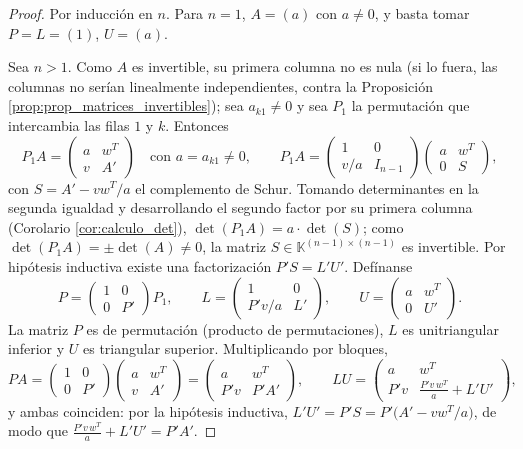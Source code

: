 \documentclass[11pt, a4paper]{article}
\begin{document}
\begin{proof}
Por inducción en $n$. Para $n = 1$, $A = (a)$ con $a \neq 0$, y basta tomar $P = L = (1)$, $U = (a)$.

Sea $n > 1$. Como $A$ es invertible, su primera columna no es nula (si lo fuera, las columnas no serían linealmente independientes, contra la Proposición \ref{prop:prop_matrices_invertibles}); sea $a_{k1} \neq 0$ y sea $P_1$ la permutación que intercambia las filas $1$ y $k$. Entonces
\[
P_1 A = \begin{pmatrix} a & w^T \\ v & A' \end{pmatrix} \quad \text{con } a = a_{k1} \neq 0,
\qquad
P_1 A = \begin{pmatrix} 1 & 0 \\ v/a & I_{n-1} \end{pmatrix} \begin{pmatrix} a & w^T \\ 0 & S \end{pmatrix},
\]
con $S = A' - v w^T / a$ el complemento de Schur. Tomando determinantes en la segunda igualdad y desarrollando el segundo factor por su primera columna (Corolario \ref{cor:calculo_det}), $\det(P_1 A) = a \cdot \det(S)$; como $\det(P_1 A) = \pm \det(A) \neq 0$, la matriz $S \in \mathbb{K}^{(n-1) \times (n-1)}$ es invertible. Por hipótesis inductiva existe una factorización $P' S = L' U'$. Defínanse
\[
P = \begin{pmatrix} 1 & 0 \\ 0 & P' \end{pmatrix} P_1, \qquad
L = \begin{pmatrix} 1 & 0 \\ P'v/a & L' \end{pmatrix}, \qquad
U = \begin{pmatrix} a & w^T \\ 0 & U' \end{pmatrix}.
\]
La matriz $P$ es de permutación (producto de permutaciones), $L$ es unitriangular inferior y $U$ es triangular superior. Multiplicando por bloques,
\[
P A = \begin{pmatrix} 1 & 0 \\ 0 & P' \end{pmatrix} \begin{pmatrix} a & w^T \\ v & A' \end{pmatrix}
= \begin{pmatrix} a & w^T \\ P'v & P'A' \end{pmatrix},
\qquad
L U = \begin{pmatrix} a & w^T \\ P'v & \frac{P'v \, w^T}{a} + L'U' \end{pmatrix},
\]
y ambas coinciden: por la hipótesis inductiva, $L'U' = P'S = P' \big( A' - v w^T/a \big)$, de modo que $\frac{P'v \, w^T}{a} + L'U' = P'A'$.
\end{proof}
\end{document}
